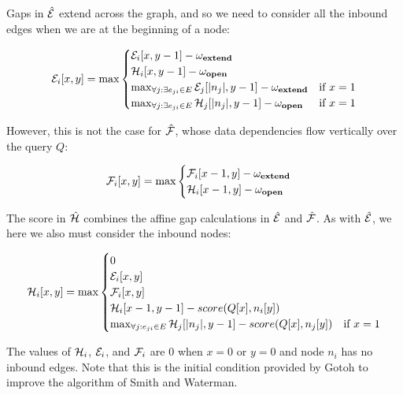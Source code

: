 Gaps in $\hat{\cal E}$ extend across the graph, and so we need to consider all the inbound edges when we are at the beginning of a node:

\begin{equation}
  {\cal E}_i[x,y] = \max
  \begin{cases}
    {\cal E}_i[x,y-1] - \omega_\textbf{extend} \\
    {\cal H}_i[x,y-1] - \omega_\textbf{open} \\
    \max_{\forall j : \exists e_{ji} \in E} {\cal E}_j[|n_j|,y-1] - \omega_\textbf{extend} & \text{if } x = 1 \\
    \max_{\forall j : \exists e_{ji} \in E} {\cal H}_j[|n_j|,y-1] - \omega_\textbf{open} & \text{if } x = 1 \\
  \end{cases}
\end{equation}

However, this is not the case for $\hat{\cal F}$, whose data dependencies flow vertically over the query $Q$:

\begin{equation}
  {\cal F}_i[x,y] = \max
  \begin{cases}
    {\cal F}_i[x-1,y] - \omega_\textbf{extend} \\
    {\cal H}_i[x-1,y] - \omega_\textbf{open} \\
  \end{cases}
\end{equation}


The score in $\hat{\cal H}$ combines the affine gap calculations in $\hat{\cal E}$ and $\hat{\cal F}$.
As with $\hat{\cal E}$, we here we also must consider the inbound nodes:

\begin{equation}
  \label{eqn:gssw_h}
  {\cal H}_i[x,y] = \max
  \begin{cases}
    0 \\
    {\cal E}_i[x,y] \\
    {\cal F}_i[x,y] \\
    {\cal H}_i[x-1,y-1] - score(Q[x], n_i[y])\\
    \max_{\forall j : e_{ji} \in E} {\cal H}_j[|n_j|,y-1] - score(Q[x], n_j[y]) & \text{if } x = 1 \\
  \end{cases}
\end{equation}

The values of ${\cal H}_i$, ${\cal E}_i$, and ${\cal F}_i$ are 0 when $x = 0$ or $y = 0$ and node $n_i$ has no inbound edges.
Note that this is the initial condition provided by Gotoh to improve the algorithm of Smith and Waterman.

